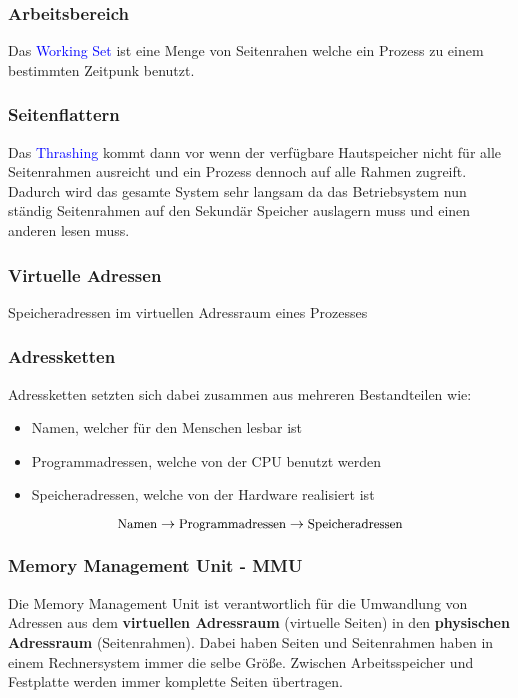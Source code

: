\documentclass[10pt,a4paper]{article}
\begin{document}
\begin{multicols*}{4}
\subsubsection*{Arbeitsbereich}
Das \textcolor{blue}{Working Set} ist eine Menge von Seitenrahen welche ein Prozess zu einem bestimmten Zeitpunk
benutzt.

\subsubsection*{Seitenflattern}
Das \textcolor{blue}{Thrashing} kommt dann vor wenn der verfügbare Hautspeicher nicht für alle Seitenrahmen ausreicht
und ein Prozess dennoch auf alle Rahmen zugreift. Dadurch wird das gesamte System sehr langsam da das Betriebsystem nun
ständig Seitenrahmen auf den Sekundär Speicher auslagern muss und einen anderen lesen muss.

\subsubsection*{Virtuelle Adressen}
Speicheradressen im virtuellen Adressraum eines Prozesses

\subsubsection*{Adressketten}
Adressketten setzten sich dabei zusammen aus mehreren Bestandteilen wie:
\begin{itemize}
	\item Namen, welcher für den Menschen lesbar ist
	\item Programmadressen, welche von der CPU benutzt werden
	\item Speicheradressen, welche von der Hardware realisiert ist
\end{itemize}
\[\text{\small Namen}\rightarrow\text{\small Programmadressen}\rightarrow\text{\small Speicheradressen}\]

\subsubsection*{Memory Management Unit - MMU}
Die Memory Management Unit ist verantwortlich für die Umwandlung von Adressen aus dem \textbf{virtuellen Adressraum}
(virtuelle Seiten) in den \textbf{physischen Adressraum} (Seitenrahmen). Dabei haben Seiten und Seitenrahmen haben in
einem Rechnersystem immer die selbe Größe. Zwischen Arbeitsspeicher und Festplatte werden immer komplette Seiten
übertragen.


\end{multicols*}
\end{document}
